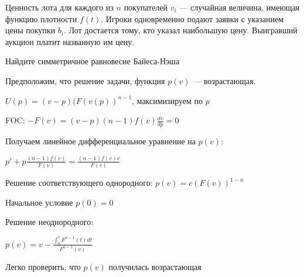 \begin{problem}
Ценность лота для каждого из $n$ покупателей  $v_{i} $  — случайная величина, имеющая функцию плотности $f(t)$. Игроки одновременно подают заявки с указанием цены покупки  $b_{i}$. Лот достается тому, кто указал наибольшую цену. Выигравший аукцион платит названную им цену. \par
Найдите симметричное равновесие Байеса-Нэша

\begin{sol}

Предположим, что решение задачи, функция $p(v)$ — возрастающая. \par
$U(p)=(v-p)(F(v(p))^{n-1}$, максимизируем по $p$ \par
FOC: $-F(v)=(v-p)(n-1)f(v)\frac{dv}{dp}=0$ \par
Получаем линейное дифференциальное уравнение на $p(v)$: \par
$p'+p\frac{(n-1)f(v)}{F(v)}=\frac{(n-1)f(v)v}{F(v)}$ \par
Решение соответствующего однородного: $p(v)=c(F(v))^{1-n}$ \par
Начальное условие $p(0)=0$ \par
Решение неоднородного: \par
$p(v)=v-\frac{\int_{0}^{v}F^{n-1}(t)dt}{F^{n-1}(v)}$ \par
Легко проверить, что $p(v)$ получилась возрастающая
\end{sol}
\end{problem}



